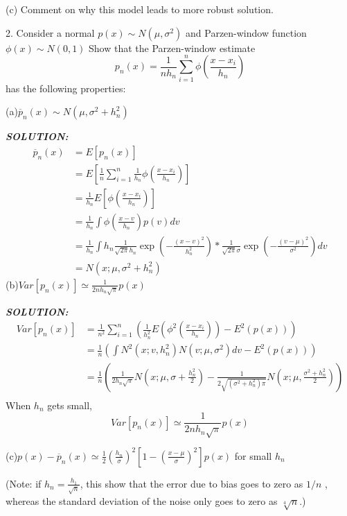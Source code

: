 \documentclass{article}
\theoremstyle{definition}
\theoremstyle{definition}
\theoremstyle{remark}
\begin{document}
\qquad (c) Comment on why this model leads to more robust solution.


2.  Consider a normal $p(x)\sim N(\mu,\sigma^2)$ and Parzen-window function $\phi(x)\sim N(0,1)$ Show that the Parzen-window estimate
$$
p_n(x) = \frac{1}{nh_n}\sum_{i=1}^{n}\phi(\frac{x-x_i}{h_n})
$$
has the following properties:

(a)$\overline{p}_n(x)\sim N(\mu,\sigma^2+h_n^2)$

\emph{\textbf{SOLUTION:}}\\
\begin{equation}\nonumber
\begin{aligned}
\overline{p}_n(x) &= E[p_n(x)] \\
&= E[\frac{1}{n}\sum_{i=1}^{n}\frac{1}{h_n}\phi(\frac{x-x_i}{h_n})]\\
&= \frac{1}{h_n}E[\phi(\frac{x-x_i}{h_n})]\\
&= \frac{1}{h_n}\int \phi(\frac{x-v}{h_n})p(v)dv \\
&= \frac{1}{h_n}\int h_n \frac{1}{\sqrt{2\pi}h_n}\exp(-\frac{(x-v)^2}{h_n^2})*\frac{1}{\sqrt{2\pi}\sigma}\exp(-\frac{(v-\mu)^2}{\sigma^2}) dv\\
&= N(x;\mu,\sigma^2+h_n^2)
\end{aligned}
\end{equation}
(b)$Var[p_n(x)] \simeq \frac{1}{2nh_n\sqrt{\pi}}p(x)$

\emph{\textbf{SOLUTION:}}\\
\begin{equation}\nonumber
\begin{aligned}
Var[p_n(x)] &= \frac{1}{n^2}\sum_{i=1}^{n}\left(\frac{1}{h_n^2}E(\phi^2(\frac{x-x_i}{h_n}))-E^2(p(x))\right)\\
&= \frac{1}{n}\left(\int N^2(x;v,h_n^2)N(v;\mu,\sigma^2)dv -E^2(p(x))\right)\\
&= \frac{1}{n}\left(\frac{1}{2h_n\sqrt{\pi}}N(x;\mu,\sigma+\frac{h_n^2}{2}) - \frac{1}{2\sqrt{(\sigma^2+h_n^2)\pi}}N(x;\mu,\frac{\sigma^2+h_n^2}{2})\right)\\
\end{aligned}
\end{equation}
When $h_n$ gets small, \[Var[p_n(x)] \simeq \frac{1}{2nh_n\sqrt{\pi}}p(x)\]

(c)$p(x)-\overline{p}_n(x)\simeq \frac{1}{2}(\frac{h_n}{\sigma})^2[1-(\frac{x-\mu}{\sigma})^2]p(x)$ for small $h_n $

(Note: if $h_n = \frac{h_1}{\sqrt n} $, this show that the error due to bias goes to zero as $1/n $ , whereas the
standard deviation of the noise only goes to zero as ${\sqrt[4]{n}} $.)
\end{document}
